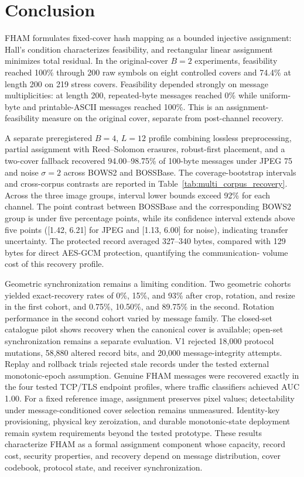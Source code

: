 \documentclass[preprint,12pt]{elsarticle}
\theoremstyle{plain}
\begin{document}
{\color{blue}
\section{Conclusion}
\label{sec:conclusion}

FHAM formulates fixed-cover hash mapping as a bounded injective assignment:
Hall's condition characterizes feasibility, and rectangular linear assignment
minimizes total residual. In the original-cover $B=2$ experiments, feasibility
reached 100\% through 200 raw symbols on eight controlled covers and 74.4\%
at length 200 on 219 stress covers. Feasibility depended strongly on message
multiplicities: at length 200, repeated-byte messages reached 0\% while
uniform-byte and printable-ASCII messages reached 100\%. This is an
assignment-feasibility measure on the original cover, separate from post-channel recovery.

A separate preregistered $B=4$, $L=12$ profile combining lossless preprocessing,
partial assignment with Reed--Solomon erasures, robust-first placement, and a
two-cover fallback recovered 94.00--98.75\% of 100-byte messages under JPEG
75 and noise $\sigma=2$ across BOWS2 and BOSSBase. The coverage-bootstrap
intervals and cross-corpus contrasts are reported in Table~\ref{tab:multi_corpus_recovery}.
Across the three image groups, interval lower bounds exceed 92\% for each
channel. The point contrast between BOSSBase and the corresponding BOWS2
group is under five percentage points, while its confidence interval extends
above five points ([1.42, 6.21] for JPEG and [1.13, 6.00] for noise), indicating
transfer uncertainty. The protected record averaged 327--340 bytes, compared
with 129 bytes for direct AES-GCM protection, quantifying the communication-
volume cost of this recovery profile.

Geometric synchronization remains a limiting condition. Two geometric cohorts yielded exact-recovery rates of 0\%, 15\%, and 93\%
after crop, rotation, and resize in the first cohort, and 0.75\%, 10.50\%,
and 89.75\% in the second. Rotation performance in the second cohort varied
by message family. The closed-set
catalogue pilot shows recovery when the canonical cover is available; open-set
synchronization remains a separate evaluation. V1 rejected 18,000 protocol
mutations, 58,880 altered record bits, and 20,000 message-integrity attempts.
Replay and rollback trials rejected stale records under the tested external
monotonic-epoch assumption. Genuine FHAM messages were recovered exactly in
the four tested TCP/TLS endpoint profiles, where traffic classifiers achieved
AUC 1.00. For a fixed reference image, assignment preserves pixel values;
detectability under message-conditioned cover selection remains unmeasured.
Identity-key provisioning, physical key zeroization, and durable monotonic-state
deployment remain system requirements beyond the tested prototype. These results
characterize FHAM as a formal assignment component whose capacity, record
cost, security properties, and recovery depend on message distribution, cover
codebook, protocol state, and receiver synchronization.

}
\end{document}
